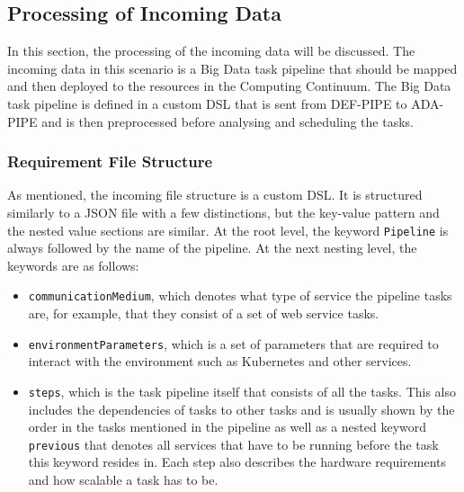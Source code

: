\documentclass{article}
\begin{document}
            

        \subsection{Processing of Incoming Data}
        \label{sec:processing-of-data-server}

            In this section, the processing of the incoming data will be discussed.
            The incoming data in this scenario is a Big Data task pipeline that should be mapped and then deployed to the resources in the Computing Continuum. The Big Data task pipeline is defined in a custom DSL \cite{mehranDSLDEFPIPEExample2023} that is sent from DEF-PIPE to ADA-PIPE and is then preprocessed before analysing and scheduling the tasks. 

            \subsubsection{Requirement File Structure}
            \label{sec:requirement-file-structure-server}

                As mentioned, the incoming file structure is a custom DSL.
                It is structured similarly to a JSON file with a few distinctions, but the key-value pattern and the nested value sections are similar. At the root level, the keyword \texttt{Pipeline} is always followed by the name of the pipeline.
                At the next nesting level, the keywords are as follows: 
                \begin{itemize}
                    \item \texttt{communicationMedium}, which denotes what type of service the pipeline tasks are, for example, that they consist of a set of web service tasks.
                    \item \texttt{environmentParameters}, which is a set of parameters that are required to interact with the environment such as Kubernetes and other services.
                    \item \texttt{steps}, which is the task pipeline itself that consists of all the tasks. This also includes the dependencies of tasks to other tasks and is usually shown by the order in the tasks mentioned in the pipeline as well as a nested keyword \texttt{previous} that denotes all services that have to be running before the task this keyword resides in. Each step also describes the hardware requirements and how scalable a task has to be.
                \end{itemize}
                
\end{document}
